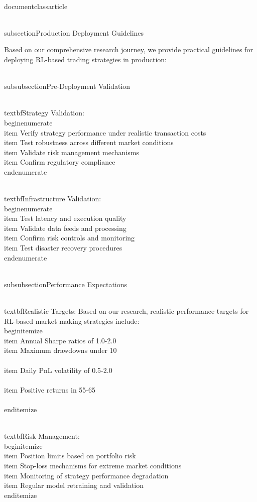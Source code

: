 \\documentclass{article}
\begin{document}
\\subsection{Production Deployment Guidelines}

Based on our comprehensive research journey, we provide practical guidelines for deploying RL-based trading strategies in production:

\\subsubsection{Pre-Deployment Validation}

\\textbf{Strategy Validation}:
\\begin{enumerate}
\\item Verify strategy performance under realistic transaction costs
\\item Test robustness across different market conditions
\\item Validate risk management mechanisms
\\item Confirm regulatory compliance
\\end{enumerate}

\\textbf{Infrastructure Validation}:
\\begin{enumerate}
\\item Test latency and execution quality
\\item Validate data feeds and processing
\\item Confirm risk controls and monitoring
\\item Test disaster recovery procedures
\\end{enumerate}

\\subsubsection{Performance Expectations}

\\textbf{Realistic Targets}:
Based on our research, realistic performance targets for RL-based market making strategies include:
\\begin{itemize}
\\item Annual Sharpe ratios of 1.0-2.0
\\item Maximum drawdowns under 10\\%
\\item Daily PnL volatility of 0.5-2.0\\%
\\item Positive returns in 55-65\\%
\\end{itemize}

\\textbf{Risk Management}:
\\begin{itemize}
\\item Position limits based on portfolio risk
\\item Stop-loss mechanisms for extreme market conditions
\\item Monitoring of strategy performance degradation
\\item Regular model retraining and validation
\\end{itemize}
\end{document}

